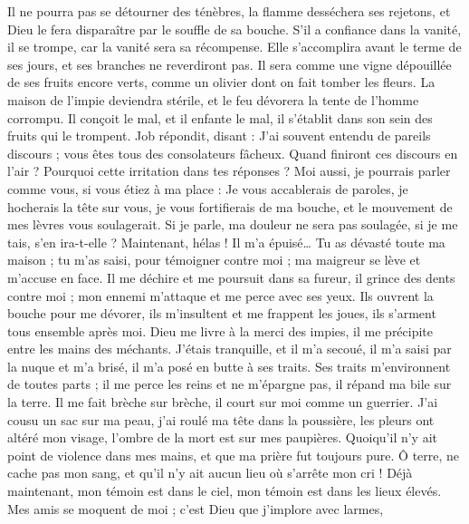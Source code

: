 \begin{multicols}{2}
Il ne pourra pas se détourner des ténèbres, la flamme desséchera ses rejetons, et Dieu le fera disparaître par le souffle de sa bouche.
S'il a confiance dans la vanité, il se trompe, car la vanité sera sa récompense.
Elle s'accomplira avant le terme de ses jours, et ses branches ne reverdiront pas.
Il sera comme une vigne dépouillée de ses fruits encore verts, comme un olivier dont on fait tomber les fleurs.
La maison de l'impie deviendra stérile, et le feu dévorera la tente de l'homme corrompu.
Il conçoit le mal, et il enfante le mal, il s'établit dans son sein des fruits qui le trompent.
\VerseOne{}Job répondit, disant :
J'ai souvent entendu de pareils discours ; vous êtes tous des consolateurs fâcheux.
Quand finiront ces discours en l'air ? Pourquoi cette irritation dans tes réponses ?
Moi aussi, je pourrais parler comme vous, si vous étiez à ma place : Je vous accablerais de paroles, je hocherais la tête sur vous,
je vous fortifierais de ma bouche, et le mouvement de mes lèvres vous soulagerait.
Si je parle, ma douleur ne sera pas soulagée, si je me tais, s'en ira-t-elle ?
Maintenant, hélas ! Il m'a épuisé… Tu as dévasté toute ma maison ;
tu m'as saisi, pour témoigner contre moi ; ma maigreur se lève et m'accuse en face.
Il me déchire et me poursuit dans sa fureur, il grince des dents contre moi ; mon ennemi m'attaque et me perce avec ses yeux.
Ils ouvrent la bouche pour me dévorer, ils m'insultent et me frappent les joues, ils s'arment tous ensemble après moi.
Dieu me livre à la merci des impies, il me précipite entre les mains des méchants.
J'étais tranquille, et il m'a secoué, il m'a saisi par la nuque et m'a brisé, il m'a posé en butte à ses traits.
Ses traits m'environnent de toutes parts ; il me perce les reins et ne m'épargne pas, il répand ma bile sur la terre.
Il me fait brèche sur brèche, il court sur moi comme un guerrier.
J'ai cousu un sac sur ma peau, j'ai roulé ma tête dans la poussière,
les pleurs ont altéré mon visage, l'ombre de la mort est sur mes paupières.
Quoiqu'il n'y ait point de violence dans mes mains, et que ma prière fut toujours pure.
Ô terre, ne cache pas mon sang, et qu'il n'y ait aucun lieu où s'arrête mon cri !
Déjà maintenant, mon témoin est dans le ciel, mon témoin est dans les lieux élevés.
Mes amis se moquent de moi ; c'est Dieu que j'implore avec larmes,

\end{multicols}
